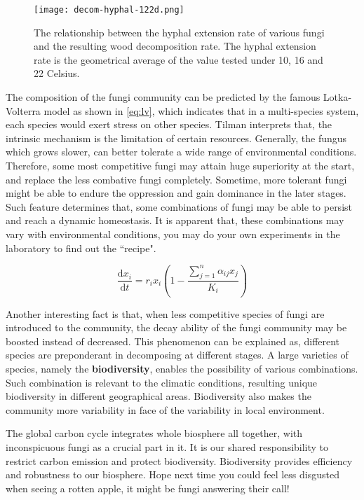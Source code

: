 \begin{figure}
    \begin{minipage}{0.5\textwidth}
        \centering
        \texttt{[image: decom-hyphal-122d.png]}
    \end{minipage}
    \begin{minipage}{0.5\textwidth}
        \caption{The relationship between the hyphal extension rate of various fungi and the resulting wood decomposition rate. The hyphal extension rate is the geometrical average of the value tested under 10, 16 and 22 Celsius.}
    \end{minipage}
\end{figure}

The composition of the fungi community can be predicted by the famous Lotka-Volterra model as shown in \eqref{eq:lv}, which indicates that in a multi-species system, each species would exert stress on other species. Tilman interprets that, the intrinsic mechanism is the limitation of certain resources. Generally, the fungus which grows slower, can better tolerate a wide range of environmental conditions. Therefore, some most competitive fungi may attain huge superiority at the start, and replace the less combative fungi completely. Sometime, more tolerant fungi might be able to endure the oppression and gain dominance in the later stages. Such feature determines that, some combinations of fungi may be able to persist and reach a dynamic homeostasis. It is apparent that, these combinations may vary with environmental conditions, you may do your own experiments in the laboratory to find out the ``recipe".

\[
    \label{eq:lv}\tag{$\ast$}
    \frac{\mathrm{d}x_i}{\mathrm{d}t} =
    r_ix_i\left(1 - \frac{\sum_{j=1}^n \alpha_{ij}x_j}{K_i}\right)
\]

Another interesting fact is that, when less competitive species of fungi are introduced to the community, the decay ability of the fungi community may be boosted instead of decreased. This phenomenon can be explained as, different species are preponderant in decomposing at different stages. A large varieties of species, namely the \textbf{biodiversity}, enables the possibility of various combinations. Such combination is relevant to the climatic conditions, resulting unique biodiversity in different geographical areas. Biodiversity also makes the community more variability in face of the variability in local environment.

The global carbon cycle integrates whole biosphere all together, with inconspicuous fungi as a crucial part in it. It is our shared responsibility to restrict carbon emission and protect biodiversity. Biodiversity provides efficiency and robustness to our biosphere. Hope next time you could feel less disgusted when seeing a rotten apple, it might be fungi answering their call!
